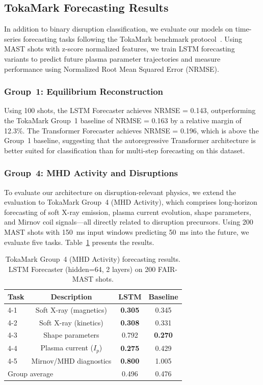 \documentclass[twocolumn]{article}
\begin{document}
\subsection{TokaMark Forecasting Results}

In addition to binary disruption classification, we evaluate our
models on time-series forecasting tasks following the TokaMark
benchmark protocol~\citep{tokamark2026}.
Using MAST shots with z-score normalized features, we train LSTM
forecasting variants to predict future plasma parameter
trajectories and measure performance using Normalized Root Mean
Squared Error (NRMSE).

\subsubsection{Group~1: Equilibrium Reconstruction}

Using 100 shots, the LSTM Forecaster achieves NRMSE = 0.143, outperforming
the TokaMark Group~1 baseline of NRMSE = 0.163 by a relative
margin of 12.3\%.
The Transformer Forecaster achieves NRMSE = 0.196, which is above
the Group~1 baseline, suggesting that the autoregressive
Transformer architecture is better suited for classification than
for multi-step forecasting on this dataset.

\subsubsection{Group~4: MHD Activity and Disruptions}

To evaluate our architecture on disruption-relevant physics, we
extend the evaluation to TokaMark Group~4 (MHD Activity), which
comprises long-horizon forecasting of soft X-ray emission, plasma
current evolution, shape parameters, and Mirnov coil signals---all
directly related to disruption precursors.
Using 200 MAST shots with 150~ms input windows predicting 50~ms
into the future, we evaluate five tasks. Table~\ref{tab:group4}
presents the results.

\begin{table}[h]
\centering
\caption{TokaMark Group~4 (MHD Activity) forecasting results.
LSTM Forecaster (hidden=64, 2 layers) on 200 FAIR-MAST shots.}
\label{tab:group4}
\begin{tabular}{@{}lccc@{}}
\toprule
Task & Description & LSTM & Baseline \\
\midrule
4-1 & Soft X-ray (magnetics) & \textbf{0.305} & 0.345 \\
4-2 & Soft X-ray (kinetics)  & \textbf{0.308} & 0.331 \\
4-3 & Shape parameters       & 0.792          & \textbf{0.270} \\
4-4 & Plasma current ($I_p$) & \textbf{0.275} & 0.429 \\
4-5 & Mirnov/MHD diagnostics & \textbf{0.800} & 1.005 \\
\midrule
\multicolumn{2}{l}{Group average} & 0.496 & 0.476 \\
\bottomrule
\end{tabular}
\end{table}
\end{document}
